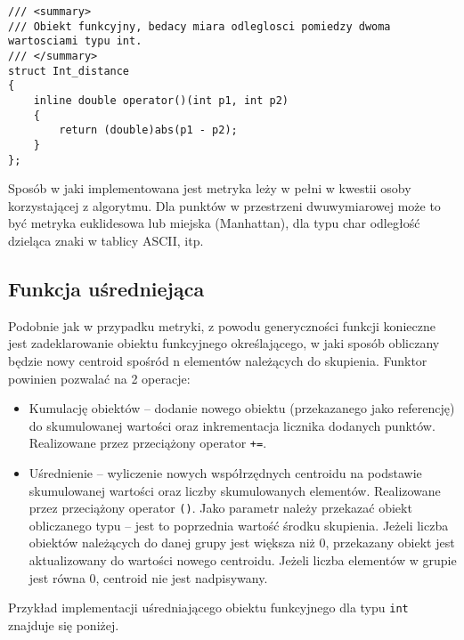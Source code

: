 \begin{lstlisting}
/// <summary>
/// Obiekt funkcyjny, bedacy miara odleglosci pomiedzy dwoma wartosciami typu int.
/// </summary>
struct Int_distance
{
	inline double operator()(int p1, int p2)
	{
		return (double)abs(p1 - p2);
	}
};
\end{lstlisting}

Sposób w jaki implementowana jest metryka leży w pełni w kwestii osoby korzystającej z algorytmu. Dla punktów w przestrzeni dwuwymiarowej może to być metryka euklidesowa lub miejska (Manhattan), dla typu char odległość dzieląca znaki w tablicy ASCII, itp.

\subsection{Funkcja uśredniejąca}\label{avg}

Podobnie jak w przypadku metryki, z powodu generyczności funkcji konieczne jest zadeklarowanie obiektu funkcyjnego określającego, w jaki sposób obliczany będzie nowy centroid spośród n elementów należących do skupienia. Funktor powinien pozwalać na 2 operacje:

\begin{itemize}
	\item Kumulację obiektów -- dodanie nowego obiektu (przekazanego jako referencję) do skumulowanej wartości oraz inkrementacja licznika dodanych punktów. Realizowane przez przeciążony operator \texttt{+=}.
	\item Uśrednienie -- wyliczenie nowych współrzędnych centroidu na podstawie skumulowanej wartości oraz liczby skumulowanych elementów. Realizowane przez przeciążony operator \texttt{()}. Jako parametr należy przekazać obiekt obliczanego typu -- jest to poprzednia wartość środku skupienia. Jeżeli liczba obiektów należących do danej grupy jest większa niż 0, przekazany obiekt jest aktualizowany do wartości nowego centroidu. Jeżeli liczba elementów w grupie jest równa 0, centroid nie jest nadpisywany.
\end{itemize}

Przykład implementacji uśredniającego obiektu funkcyjnego dla typu \texttt{int} znajduje się poniżej.

